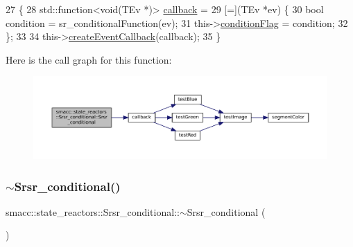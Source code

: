 \begin{DoxyCode}
27     \{
28         std::function<void(TEv *)> \hyperlink{sm__ridgeback__barrel__search__1_2servers_2opencv__perception__node_2opencv__perception__node_8cpp_a050e697bd654facce10ea3f6549669b3}{callback} =
29             [=](TEv *ev) \{
30                 \textcolor{keywordtype}{bool} condition = sr\_conditionalFunction(ev);
31                 this->\hyperlink{classsmacc_1_1state__reactors_1_1Srsr__conditional_a2c1c6a4acf1429526fe8c84e66479fbc}{conditionFlag} = condition;
32             \};
33 
34         this->\hyperlink{classsmacc_1_1StateReactor_a68482e08f6449694a0bcda843b14b376}{createEventCallback}(callback);
35     \}
\end{DoxyCode}
Here is the call graph for this function\+:
\nopagebreak
\begin{figure}[H]
\begin{center}
\leavevmode
\includegraphics[width=350pt]{classsmacc_1_1state__reactors_1_1Srsr__conditional_a4f36ec873e26c4a8288f08f4d68924d3_cgraph}
\end{center}
\end{figure}
\mbox{\label{classsmacc_1_1state__reactors_1_1Srsr__conditional_a711473830935c7c4fb1d0939e41fb2cb}} 
\subsubsection{\texorpdfstring{$\sim$\+Srsr\+\_\+conditional()}{~Srsr\_conditional()}}
{\footnotesize\ttfamily smacc\+::state\+\_\+reactors\+::\+Srsr\+\_\+conditional\+::$\sim$\+Srsr\+\_\+conditional (\begin{DoxyParamCaption}{ }\end{DoxyParamCaption})}



